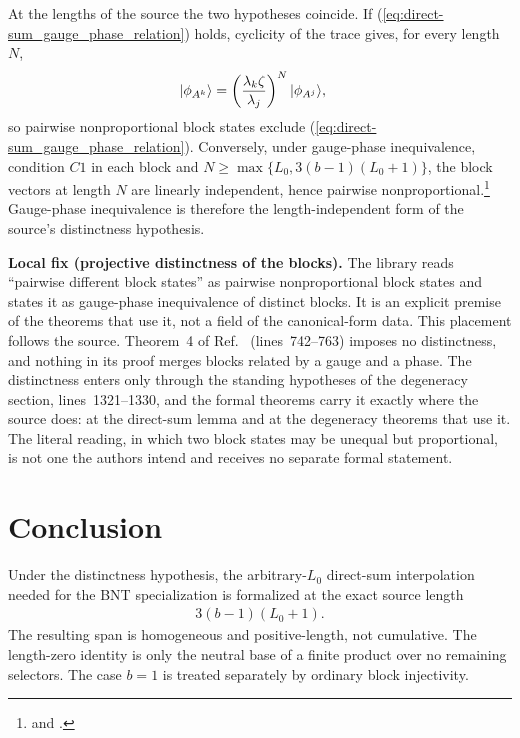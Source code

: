 \documentclass{article}
\begin{document}
At the lengths of the source the two hypotheses coincide. If
(\ref{eq:direct-sum_gauge_phase_relation}) holds, cyclicity of the trace gives,
for every length $N$,
\begin{align}
    |\phi_{A^k}\rangle
     & =\left(\frac{\lambda_k\zeta}{\lambda_j}\right)^N|\phi_{A^j}\rangle,
    \label{eq:direct-sum_gauge_phase_proportional}
\end{align}
so pairwise nonproportional block states exclude
(\ref{eq:direct-sum_gauge_phase_relation}). Conversely, under gauge-phase
inequivalence, condition $C1$ in each block and
$N\ge\max\{L_0,3(b-1)(L_0+1)\}$, the block vectors at length $N$ are linearly
independent, hence pairwise nonproportional.\footnote{%
     and
    .}
Gauge-phase inequivalence is therefore the length-independent form of the
source's distinctness hypothesis.

\textbf{Local fix (projective distinctness of the blocks).} The library reads
``pairwise different block states'' as pairwise nonproportional block states
and states it as gauge-phase inequivalence of distinct blocks. It is an
explicit premise of the theorems that use it, not a field of the canonical-form
data. This placement follows the source. Theorem~4 of
Ref.~\cite{PerezGarcia2007MPSReps} (lines~742--763) imposes no distinctness,
and nothing in its proof merges blocks related by a gauge and a phase. The
distinctness enters only through the standing hypotheses of the degeneracy
section, lines~1321--1330, and the formal theorems carry it exactly where the
source does: at the direct-sum lemma and at the degeneracy theorems that use
it. The literal reading, in which two block states may be unequal but
proportional, is not one the authors intend and receives no separate formal
statement.

\section{Conclusion}

Under the distinctness hypothesis, the arbitrary-$L_0$ direct-sum interpolation
needed for the BNT specialization is formalized at the exact source length
\begin{align}
    3(b-1)(L_0+1).
    \label{eq:direct-sum_exact_formalized_length}
\end{align}
The resulting span is homogeneous and positive-length, not cumulative. The
length-zero identity is only the neutral base of a finite product over no
remaining selectors. The case $b=1$ is treated separately by ordinary block
injectivity.
\end{document}
